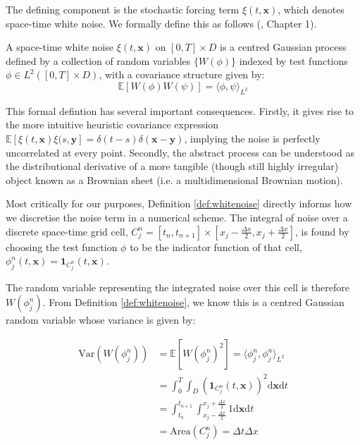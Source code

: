 The defining component is the stochastic forcing term $\xi(t,\mathbf{x})$, which denotes 
space-time white noise. We formally define this as follows (\cite{walsh2006introduction}, Chapter 1).

\begin{definition}
\label{def:whitenoise}
A space-time white noise $\xi(t,\mathbf{x})$ on $[0,T] \times D$ is a centred
Gaussian process defined by a collection of random variables 
$\{W(\phi)\}$ indexed by test functions $\phi \in L^2([0,T] \times D)$, 
with a covariance structure given by:
\[
\mathbb{E}[W(\phi)W(\psi)] = \langle \phi, \psi \rangle_{L^2}
\]
\end{definition}

This formal defintion has several important consequences. Firstly, it gives rise 
to the more intuitive heuristic covariance expression 
$\mathbb{E}\left[\xi(t,\mathbf{x})\xi(s,\mathbf{y}\right] = 
\delta(t-s)\delta(\mathbf{x}-\mathbf{y})$, implying the noise is perfectly uncorrelated 
at every point. Secondly, the abstract process can be understood as the distributional
derivative of a more tangible (though still highly irregular) object
known as a Brownian sheet (i.e. a multidimensional Brownian motion).

Most critically for our purposes, Definition \ref{def:whitenoise} directly informs 
how we discretise the noise term in a numerical scheme. The integral of 
noise over a discrete space-time grid cell, $C_j^n = [t_n, t_{n+1}] \times
[x_j - \frac{\Delta x}{2}, x_j + \frac{\Delta x}{2}]$, is found by choosing the test
function $\phi$ to be the indicator function of that cell, $\phi_j^n(t, \mathbf{x}) 
= \mathbf{1}_{C_j^n}(t, \mathbf{x})$. 

The random variable representing the integrated noise over this cell is therefore 
$W(\phi_j^n)$. From Definition \ref{def:whitenoise}, we know this is a centred Gaussian 
random variable whose variance is given by:

\begin{subequations}\label{eq:white_noise_integral_derivation}
    \begin{align*}
        \mathrm{Var}(W(\phi_j^n)) &= \mathbb{E}[W(\phi_j^n)^2] = 
        \langle \phi_j^n, \phi_j^n \rangle_{L^2} \\
        &= \int_0^T \int_D (\mathbf{1}_{C_j^n}(t, \mathbf{x}))^2 
        \mathrm{d}\mathbf{x} \mathrm{d}t \\
        &= \int_{t_n}^{t_{n+1}} \int_{x_j-\frac{\Delta x}{2}}^{x_j+\frac{\Delta x}{2}} 1
        \mathrm{d}\mathbf{x}\mathrm{d}t \\
        &= \text{Area}(C_j^n) = \Delta t \Delta x
    \end{align*}
\end{subequations}

